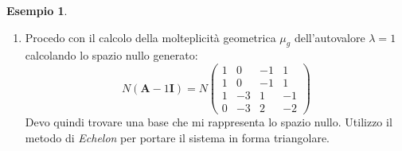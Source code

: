 \documentclass[a4paper]{article}
\renewcommand{\vec}{\bm}
\theoremstyle{definition}
\newtheorem{exmp}{Esempio}[section]
\begin{document}
\begin{exmp}
\begin{enumerate}
\begin{align*}
						\medmath{ -1\Bigg( 0 + 3 \big[ (1+\lambda) -2 \big]
											  - 3 \big[ 1 - (2-\lambda) \big] \Bigg) } \\
						&\medmath{\ \ + 1\Bigg( 0 - (1-\lambda)\big[ (1+\lambda) - 2 \big] - 0 \Bigg)} = 
						\medmath{(2-\lambda)(1-\lambda)(\lambda^2-\lambda) - 0  + (\lambda - 1)^2 }	=
						\medmath{\lambda^4 - 4\lambda^3 + 6\lambda^2 - 4\lambda + 1}\\ \\
						&=(\lambda - 1)^4 
					\end{align*}
					Ho quindi che: $\ P_A=(\lambda - 1)^4 \quad \lambda_{1,2,3,4} = 1 \quad \mu_a = 4 $.
					\item Procedo con il calcolo della molteplicità geometrica $ \mu_g $ dell'autovalore $ \lambda=1 $ calcolando lo spazio nullo generato:
					\[
						N(\vec{A} - 1\vec{I}) =
						N \begin{pmatrix}
							1 & 0 & -1 & 1 \\
							1 & 0 & -1 & 1 \\
							1 & -3 & 1 & -1 \\
							0 & -3 & 2 & -2
						\end{pmatrix}
					\]
					Devo quindi trovare una base che mi rappresenta lo spazio nullo. Utilizzo il metodo di \textit{Echelon} per portare il sistema in forma triangolare.
					

\end{enumerate}
\end{exmp}
\end{document}
